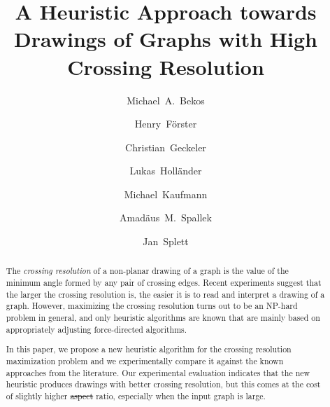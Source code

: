 \documentclass{comjnl}
\providecommand{\DIFaddtex}[1]{{\protect\color{blue}\uwave{#1}}} %
\providecommand{\DIFdeltex}[1]{{\protect\color{red}\sout{#1}}}                      %
\providecommand{\DIFaddbegin}{} %
\providecommand{\DIFaddend}{} %
\providecommand{\DIFdelbegin}{} %
\providecommand{\DIFdelend}{} %
\providecommand{\DIFadd}[1]{\texorpdfstring{\DIFaddtex{#1}}{#1}} %
\providecommand{\DIFdel}[1]{\texorpdfstring{\DIFdeltex{#1}}{}} %
\newcommand{\DIFscaledelfig}{0.5}
\newlength{\DIFdelgraphicswidth} %
\newlength{\DIFdelgraphicsheight} %
\newcommand{\DIFaddincludegraphics}[2][]{{\color{blue}\fbox{\DIFOincludegraphics[#1]{#2}}}} %
\newcommand{\DIFdelincludegraphics}[2][]{%
\sbox{\DIFdelgraphicsbox}{\DIFOincludegraphics[#1]{#2}}%
\settoboxwidth{\DIFdelgraphicswidth}{\DIFdelgraphicsbox} %
\settoboxtotalheight{\DIFdelgraphicsheight}{\DIFdelgraphicsbox} %
\scalebox{\DIFscaledelfig}{%
\parbox[b]{\DIFdelgraphicswidth}{\usebox{\DIFdelgraphicsbox}\\[-\baselineskip] \rule{\DIFdelgraphicswidth}{0em}}\llap{\resizebox{\DIFdelgraphicswidth}{\DIFdelgraphicsheight}{%
\setlength{\unitlength}{\DIFdelgraphicswidth}%
\begin{picture}(1,1)%
\thicklines\linethickness{2pt} %
{\color[rgb]{1,0,0}\put(0,0){\framebox(1,1){}}}%
{\color[rgb]{1,0,0}\put(0,0){\line( 1,1){1}}}%
{\color[rgb]{1,0,0}\put(0,1){\line(1,-1){1}}}%
\end{picture}%
}\hspace*{3pt}}} %
} %
\DeclareRobustCommand{\DIFaddbegin}{\DIFOaddbegin \let\includegraphics\DIFaddincludegraphics} %
\DeclareRobustCommand{\DIFaddend}{\DIFOaddend \let\includegraphics\DIFOincludegraphics} %
\DeclareRobustCommand{\DIFdelbegin}{\DIFOdelbegin \let\includegraphics\DIFdelincludegraphics} %
\DeclareRobustCommand{\DIFdelend}{\DIFOaddend \let\includegraphics\DIFOincludegraphics} %
\begin{document}
\author{Michael~A.~Bekos} 
\author{Henry~F\"orster}
\author{Christian~Geckeler} 
\author{Lukas~Holl\"ander} 
\author{Michael~Kaufmann}
\author{Amad\"aus~M.~Spallek} 
\author{Jan~Splett}

\title[Drawings of Graphs with High Crossing Resolution]{A Heuristic Approach towards Drawings of Graphs with High Crossing Resolution%
\DIFdelbegin %
\DIFdelend }






\volumenumber{--} 
\issuenumber{--} 

\begin{abstract}
The \emph{crossing resolution} of a non-planar drawing of a graph is the value of the minimum angle formed by any pair of crossing edges. Recent experiments suggest that the larger the crossing resolution is, the easier it is to read and interpret a drawing of a graph. However, maximizing the crossing resolution turns out to be an NP-hard problem in general, and only heuristic algorithms are known that are mainly based on appropriately adjusting force-directed algorithms.

In this paper, we propose a new heuristic algorithm for the crossing resolution maximization problem and we experimentally compare it against the known approaches from the literature. Our experimental evaluation indicates that the new heuristic produces drawings with better crossing resolution, but this comes at the cost of slightly higher \DIFdelbegin \DIFdel{aspect }\DIFdelend \DIFaddbegin \DIFadd{edge-length }\DIFaddend ratio, especially when the input graph is large. 
\end{abstract}
\end{document}
